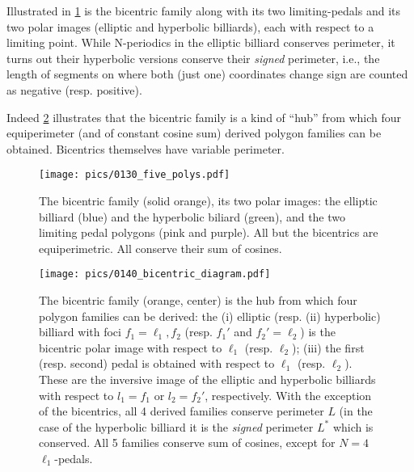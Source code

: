 Illustrated in \cref{fig:five-polys} is the bicentric family along with its two limiting-pedals and its two polar images (elliptic and hyperbolic billiards), each with respect to a limiting point. While N-periodics in the elliptic billiard conserves perimeter, it turns out their hyperbolic versions conserve their {\em signed} perimeter, i.e., the length of segments on where both (just one) coordinates change sign are counted as negative (resp. positive).

Indeed \cref{fig:bicentric-diagram} illustrates that the bicentric family is a kind of ``hub'' from which four equiperimeter (and of constant cosine sum) derived polygon families can be obtained. Bicentrics themselves have variable perimeter.

\begin{figure}
    \centering
    \texttt{[image: pics/0130\_five\_polys.pdf]}
    \caption{The bicentric family (solid orange), its two polar images: the elliptic billiard (blue) and the hyperbolic biliard (green), and the two limiting pedal polygons (pink and purple). All but the bicentrics are equiperimetric. All conserve their sum of cosines.}
    \label{fig:five-polys}
\end{figure}


\begin{figure}
    \centering
    \texttt{[image: pics/0140\_bicentric\_diagram.pdf]}
    \caption{The bicentric family (orange, center) is the hub from which four polygon families can be derived: the (i) elliptic (resp. (ii) hyperbolic) billiard with foci $f_1=\ell_1,f_2$ (resp. $f_1'$ and $f_2'=\ell_2$) is the bicentric polar image with respect to $\ell_1$ (resp. $\ell_2$); (iii) the first (resp. second) pedal is obtained with respect to $\ell_1$ (resp. $\ell_2$). These are the inversive image of the elliptic and hyperbolic billiards with respect to $l_1=f_1$ or $l_2=f_2'$, respectively. With the exception of the bicentrics, all 4 derived families conserve perimeter $L$ (in the case of the hyperbolic billiard it is the {\em signed} perimeter $L^*$ which is conserved. All 5 families conserve sum of cosines, except for $N=4$ $\ell_1$-pedals.}
    \label{fig:bicentric-diagram}
\end{figure}